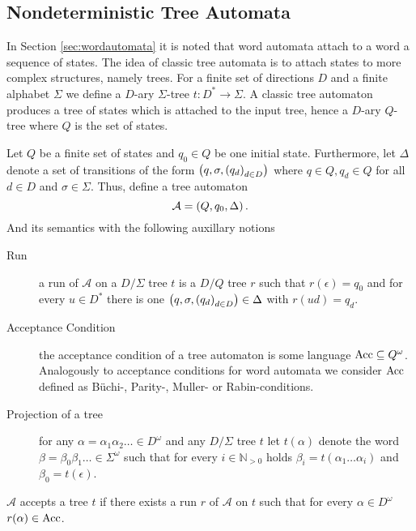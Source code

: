 \subsection{Nondeterministic Tree Automata}
In Section \ref{sec:wordautomata} it is noted that word automata attach to a
word a sequence of states. The idea of classic tree automata is to attach
states to more complex structures, namely trees. For a finite set of
directions $D$ and a finite alphabet $\Sigma$ we define a $D$-ary $\Sigma$-tree
$t:D^{*}\rightarrow\Sigma$. A classic tree automaton produces a tree of states
which is attached to the input tree, hence a $D$-ary $Q$-tree where $Q$ is the
set of states.
\begin{definition}
  Let $Q$ be a finite set of states and $q_{0}\in Q$ be one initial state.
  Furthermore, let $\Delta$ denote a set of transitions of the form
  $\left(q,\sigma, \left(q_{d}\right)_{d\in D}\right)$ where $q\in Q, q_{d}\in Q$ for
  all $d\in D$ and $\sigma\in\Sigma$. Thus, define a tree automaton
  \begin{equation*}
    \mathcal{A} = \left(Q, q_{0}, \Delta\right).
  \end{equation*}
  And its semantics with the following auxillary notions
  \begin{description}
    \item[Run] a run of $\mathcal{A}$ on a $D/\Sigma$ tree $t$ is a $D/Q$ tree
      $r$ such that $r(\epsilon) = q_{0}$ and for every $u\in D^{*}$ there is
      one $\left(q,\sigma, \left(q_{d}\right)_{d\in D}\right)\in\Delta$ with
      $r(ud) = q_{d}$.
    \item[Acceptance Condition] the acceptance condition of a tree automaton is
      some language $\operatorname{Acc}\subseteq Q^{\omega}$. Analogously to acceptance
      conditions for word automata we consider $\operatorname{Acc}$ defined as Büchi-,
      Parity-, Muller- or Rabin-conditions.
    \item[Projection of a tree] for any $\alpha=\alpha_{1}\alpha_{2}\dots\in
      D^{\omega}$ and any $D/\Sigma$ tree $t$ let $t(\alpha)$ denote the word
      $\beta = \beta_{0}\beta_{1}\dots\in\Sigma^{\omega}$ such that for every
      $i\in\mathbb{N}_{>0}$ holds $\beta_{i} = t(\alpha_{1}\dots\alpha_{i})$
      and $\beta_{0} = t(\epsilon)$.
  \end{description}
  $\mathcal{A}$ accepts a tree $t$ if there exists a run $r$ of $\mathcal{A}$
  on $t$ such that for every $\alpha\in D^{\omega}$ $r(\alpha)\in\operatorname{Acc}$.
\end{definition}
